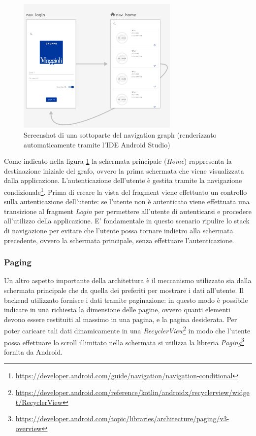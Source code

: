 \begin{figure}[H]
\centering
\includegraphics[width=0.7\textwidth]{img/Screenshot 2022-09-07 at 17.12.56.png}
\caption{Screenshot di una sottoparte del navigation graph (renderizzato automaticamente tramite l'IDE Android Studio)}
\label{fig:5.11}
\end{figure}

Come indicato nella figura \ref{fig:5.11} la schermata principale (\textit{Home}) rappresenta la destinazione iniziale del grafo, ovvero la prima schermata che viene visualizzata dalla applicazione. L'autenticazione dell'utente è gestita tramite la navigazione condizionale\footnote{\url{https://developer.android.com/guide/navigation/navigation-conditional}}. Prima di creare la vista del fragment viene effettuato un controllo sulla autenticazione dell'utente: se l'utente non è autenticato viene effettuata una transizione al fragment \textit{Login} per permettere all'utente di autenticarsi e procedere all'utilizzo della applicazione. E' fondamentale in questo scenario ripulire lo stack di navigazione per evitare che l'utente possa tornare indietro alla schermata precedente, ovvero la schermata principale, senza effettuare l'autenticazione.\\

\subsubsection{Paging}
Un altro aspetto importante della architettura è il meccanismo utilizzato sia dalla schermata principale che da quella dei preferiti per mostrare i dati all'utente. Il backend utilizzato fornisce i dati tramite paginazione: in questo modo è possibile indicare in una richiesta la dimensione delle pagine, ovvero quanti elementi devono essere restituiti al massimo in una pagina, e la pagina desiderata. Per poter caricare tali dati dinamicamente in una \textit{RecyclerView}\footnote{\url{https://developer.android.com/reference/kotlin/androidx/recyclerview/widget/RecyclerView}} in modo che l'utente possa effettuare lo scroll illimitato nella schermata si utilizza la libreria \textit{Paging}\footnote{\url{https://developer.android.com/topic/libraries/architecture/paging/v3-overview}} fornita da Android.


